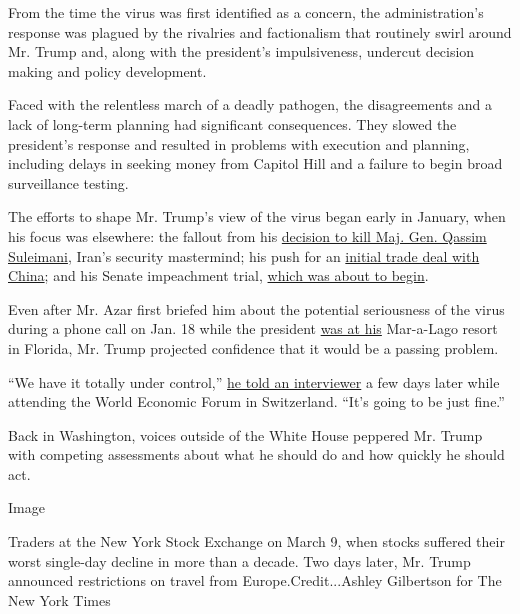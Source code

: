 From the time the virus was first identified as a concern, the
administration's response was plagued by the rivalries and factionalism
that routinely swirl around Mr. Trump and, along with the president's
impulsiveness, undercut decision making and policy development.

Faced with the relentless march of a deadly pathogen, the disagreements
and a lack of long-term planning had significant consequences. They
slowed the president's response and resulted in problems with execution
and planning, including delays in seeking money from Capitol Hill and a
failure to begin broad surveillance testing.

The efforts to shape Mr. Trump's view of the virus began early in
January, when his focus was elsewhere: the fallout from his
\href{https://www.nytimes3xbfgragh.onion/2020/01/03/world/middleeast/iranian-general-qassem-soleimani-killed.html}{decision
to kill Maj. Gen. Qassim Suleimani}, Iran's security mastermind; his
push for an
\href{https://www.nytimes3xbfgragh.onion/2019/10/11/business/economy/us-china-trade-deal.html}{initial
trade deal with China}; and his Senate impeachment trial,
\href{https://www.nytimes3xbfgragh.onion/2020/01/21/us/politics/trump.html}{which
was about to begin}.

Even after Mr. Azar first briefed him about the potential seriousness of
the virus during a phone call on Jan. 18 while the president
\href{https://www.nytimes3xbfgragh.onion/interactive/2017/04/05/us/politics/tracking-trumps-visits-to-his-branded-properties.html}{was
at his} Mar-a-Lago resort in Florida, Mr. Trump projected confidence
that it would be a passing problem.

``We have it totally under control,''
\href{https://www.cnbc.com/2020/01/22/cnbc-transcript-president-donald-trump-sits-down-with-cnbcs-joe-kernen-at-the-world-economic-forum-in-davos-switzerland.html}{he
told an interviewer} a few days later while attending the World Economic
Forum in Switzerland. ``It's going to be just fine.''

Back in Washington, voices outside of the White House peppered Mr. Trump
with competing assessments about what he should do and how quickly he
should act.

Image

Traders at the New York Stock Exchange on March 9, when stocks suffered
their worst single-day decline in more than a decade. Two days later,
Mr. Trump announced restrictions on travel from Europe.Credit...Ashley
Gilbertson for The New York Times

